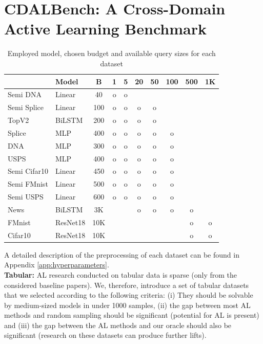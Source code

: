 \documentclass[]{article}
\begin{document}
\section{CDALBench: A Cross-Domain Active Learning Benchmark}\label{sec:datasets}
\begin{table}
	\vspace{-0.7cm}
	\caption{Employed model, chosen budget and available query sizes for each dataset}
	\vspace{0.1cm}
	\label{tab:batch_sizes}
	{\scriptsize
		\begin{tabular}{l|l|c|c|c|c|c|c|c|c}
			& Model  & B & 1 & 5 & 20 & 50 & 100 & 500 & 1K \\
			\hline
			Semi DNA    & Linear & 40 & o & o &&&&& \\
			Semi Splice & Linear & 100 & o & o & o & o &&&\\
			TopV2       & BiLSTM & 200 & o & o & o & o &&& \\
			Splice      & MLP    & 400 & o & o & o & o & o && \\
			DNA         & MLP    & 300 & o & o & o & o & o && \\
			USPS        & MLP    & 400 & o & o & o & o & o && \\
			Semi Cifar10& Linear & 450 & o & o & o & o & o && \\
			Semi FMnist & Linear & 500 & o & o & o & o & o && \\
			Semi USPS   & Linear & 600 & o & o & o & o & o && \\
			News        & BiLSTM & 3K &&& o & o & o & o &\\
			FMnist      & ResNet18& 10K &&&&&& o & o\\
			Cifar10     & ResNet18& 10K &&&&&& o & o \\
		\end{tabular}
	}
	\vspace{-0.55cm}
\end{table}
A detailed description of the preprocessing of each dataset can be found in Appendix \ref{app:hyperparameters}. \\ [1mm]
\textbf{Tabular:}
AL research conducted on tabular data is sparse (only \cite{ashdeep} from the considered baseline papers). 
We, therefore, introduce a set of tabular datasets that we selected according to the following criteria:
(i) They should be solvable by medium-sized models in under 1000 samples, (ii) the gap between most AL methods and random sampling should be significant (potential for AL is present) and (iii) the gap between the AL methods and our oracle should also be significant (research on these datasets can produce further lifts).
\end{document}
